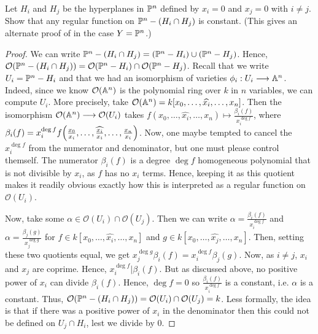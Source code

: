 \label{1.3.8}

Let $H_i$ and $H_j$ be the hyperplanes in $\P^n$ defined by $x_i = 0$ and $x_j = 0$ with $i \neq j$. Show that any regular function on $\P^n - (H_i \cap H_j)$ is constant. (This gives an alternate proof of \cite[I.3.4a]{hartshorne} in the case $Y = \P^n$.)

\begin{proof}
    We can write $\P^n - (H_i \cap H_j) = (\P^n - H_i) \cup (\P^n - H_j)$. Hence, $\mathcal O(\P^n - (H_i \cap H_j)) = \mathcal O(\P^n - H_i) \cap \mathcal O(\P^n - H_j)$. Recall that we write $U_i = \P^n - H_i$ and that we had an isomorphism of varieties $\phi_i: U_i \longrightarrow \A^n$. Indeed, since we know $\mathcal O(\A^n)$ is the polynomial ring over $k$ in $n$ variables, we can compute $U_i$. More precisely, take $\mathcal O(\A^n) = k[x_0, \dots, \widehat{x_i}, \dots, x_n]$. Then the isomorphism $\mathcal O(\A^n) \longrightarrow \mathcal O(U_i)$ takes $f(x_0, \dots, \widehat{x_i}, \dots, x_n) \mapsto \frac{\beta_i(f)}{x_i^{\deg f}}$, where $ \beta_i(f) = x_i^{\deg f} f\parens{\frac{x_0}{x_i}, \dots, \widehat{\frac{x_i}{x_i}}, \dots, \frac{x_n}{x_i}}$. Now, one maybe tempted to cancel the $x_i^{\deg f}$ from the numerator and denominator, but one must please control themself. The numerator $\beta_i(f)$ is a degree $\deg f$ homogeneous polynomial that is not divisible by $x_i$, as $f$ has no $x_i$ terms. Hence, keeping it as this quotient makes it readily obvious exactly how this is interpreted as a regular function on $\mathcal O(U_i)$.

    Now, take some $\alpha \in \mathcal O(U_i) \cap \mathcal O(U_j)$. Then we can write $\alpha = \frac{\beta_i(f)}{x_i^{\deg f}}$ and $\alpha = \frac{\beta_j(g)}{x_j^{\deg g}}$ for $f \in k[x_0, \dots, \widehat{x_i}, \dots, x_n]$ and $g \in k[x_0, \dots, \widehat{x_j}, \dots, x_n]$. Then, setting these two quotients equal, we get $x_j^{\deg g} \beta_i(f) = x_i^{\deg f} \beta_j(g)$. Now, as $i \neq j$, $x_i$ and $x_j$ are coprime. Hence, $x_i^{\deg f} | \beta_i(f)$. But as discussed above, no positive power of $x_i$ can divide $\beta_i(f)$. Hence, $\deg f = 0$ so $\frac{\beta_i(f)}{x_i^{\deg f}}$ is a constant, i.e. $\alpha$ is a constant. Thus, $\mathcal O(\P^n - (H_i \cap H_j)) = \mathcal O(U_i) \cap \mathcal O(U_j) = k$. Less formally, the idea is that if there was a positive power of $x_i$ in the denominator then this could not be defined on $U_j \cap H_i$, lest we divide by 0.
\end{proof}
